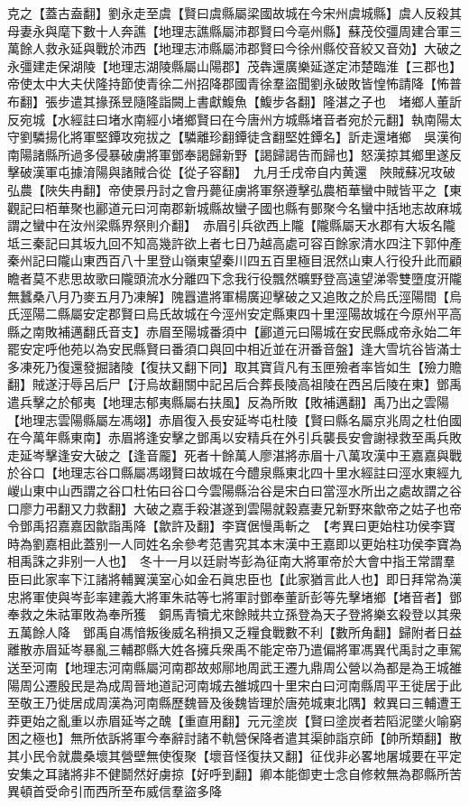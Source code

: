 克之【蓋古盍翻】劉永走至虞【賢曰虞縣屬梁國故城在今宋州虞城縣】虞人反殺其母妻永與麾下數十人奔譙【地理志譙縣屬沛郡賢曰今亳州縣】蘇茂佼彊周建合軍三萬餘人救永延與戰於沛西【地理志沛縣屬沛郡賢曰今徐州縣佼音絞又音効】大破之永彊建走保湖陵【地理志湖陵縣屬山陽郡】茂犇還廣樂延遂定沛楚臨淮【三郡也】帝使太中大夫伏隆持節使青徐二州招降郡國青徐羣盜聞劉永破敗皆惶怖請降【怖普布翻】張步遣其掾孫昱隨隆詣闕上書獻鰒魚【鰒步各翻】隆湛之子也　堵鄉人董訢反宛城【水經註曰堵水南經小堵鄉賢曰在今唐州方城縣堵音者宛於元翻】執南陽太守劉驎揚化將軍堅鐔攻宛拔之【驎離珍翻鐔徒含翻堅姓鐔名】訢走還堵鄉　吳漢徇南陽諸縣所過多侵暴破虜將軍鄧奉謁歸新野【謁歸謁告而歸也】怒漢掠其鄉里遂反擊破漢軍屯據淯陽與諸賊合從【從子容翻】　九月壬戌帝自内黄還　陜賊蘇况攻破弘農【陜失冉翻】帝使景丹討之會丹薨征虜將軍祭遵擊弘農栢華蠻中賊皆平之【東觀記曰栢華聚也酈道元曰河南郡新城縣故蠻子國也縣有鄤聚今名蠻中括地志故麻城謂之蠻中在汝州梁縣界祭則介翻】　赤眉引兵欲西上隴【隴縣屬天水郡有大坂名隴坻三秦記曰其坂九回不知高幾許欲上者七日乃越高處可容百餘家清水四注下郭仲產秦州記曰隴山東西百八十里登山嶺東望秦川四五百里極目泯然山東人行役升此而顧瞻者莫不悲思故歌曰隴頭流水分離四下念我行役飄然曠野登高遠望涕零雙墮度汧隴無蠶桑八月乃麥五月乃凍解】隗囂遣將軍楊廣迎擊破之又追敗之於烏氏涇陽間【烏氏涇陽二縣屬安定郡賢曰烏氏故城在今涇州安定縣東四十里涇陽故城在今原州平高縣之南敗補邁翻氏音支】赤眉至陽城番須中【酈道元曰陽城在安民縣成帝永始二年罷安定呼他苑以為安民縣賢曰番須口與回中相近並在汧番音盤】逢大雪坑谷皆滿士多凍死乃復還發掘諸陵【復扶又翻下同】取其寶貨凡有玉匣殮者率皆如生【殮力贍翻】賊遂汙辱呂后尸【汙烏故翻關中記呂后合葬長陵高祖陵在西呂后陵在東】鄧禹遣兵擊之於郁夷【地理志郁夷縣屬右扶風】反為所敗【敗補邁翻】禹乃出之雲陽【地理志雲陽縣屬左馮翊】赤眉復入長安延岑屯杜陵【賢曰縣名屬京兆周之杜伯國在今萬年縣東南】赤眉將逢安擊之鄧禹以安精兵在外引兵襲長安會謝禄救至禹兵敗走延岑擊逢安大破之【逢音龎】死者十餘萬人廖湛將赤眉十八萬攻漢中王嘉嘉與戰於谷口【地理志谷口縣屬馮翊賢曰故城在今醴泉縣東北四十里水經註曰涇水東經九嵕山東中山西謂之谷口杜佑曰谷口今雲陽縣治谷是宋白曰當涇水所出之處故謂之谷口廖力弔翻又力救翻】大破之嘉手殺湛遂到雲陽就穀嘉妻兄新野來歙帝之姑子也帝令鄧禹招嘉嘉因歙詣禹降【歙許及翻】李寶倨慢禹斬之　【考異曰更始柱功侯李寶時為劉嘉相此蓋别一人同姓名余參考范書究其本末漢中王嘉即以更始柱功侯李寶為相禹誅之非别一人也】　冬十一月以廷尉岑彭為征南大將軍帝於大會中指王常謂羣臣曰此家率下江諸將輔翼漢室心如金石眞忠臣也【此家猶言此人也】即日拜常為漢忠將軍使與岑彭率建義大將軍朱祜等七將軍討鄧奉董訢彭等先擊堵鄉【堵音者】鄧奉救之朱祜軍敗為奉所獲　銅馬青犢尤來餘賊共立孫登為天子登將樂玄殺登以其衆五萬餘人降　鄧禹自馮愔叛後威名稍損又乏糧食戰數不利【數所角翻】歸附者日益離散赤眉延岑暴亂三輔郡縣大姓各擁兵衆禹不能定帝乃遣偏將軍馮異代禹討之車駕送至河南【地理志河南縣屬河南郡故郟鄏地周武王遷九鼎周公營以為都是為王城雒陽周公遷殷民是為成周晉地道記河南城去雒城四十里宋白曰河南縣周平王徙居于此至敬王乃徙居成周漢為河南縣歷魏晉及後魏皆理於唐苑城東北隅】敕異曰三輔遭王莽更始之亂重以赤眉延岑之醜【重直用翻】元元塗炭【賢曰塗炭者若䧟泥墜火喻窮困之極也】無所依訴將軍今奉辭討諸不軌營保降者遣其渠帥詣京師【帥所類翻】散其小民令就農桑壞其營壁無使復聚【壞音怪復扶又翻】征伐非必畧地屠城要在平定安集之耳諸將非不健鬬然好虜掠【好呼到翻】卿本能御吏士念自修敕無為郡縣所苦異頓首受命引而西所至布威信羣盜多降

